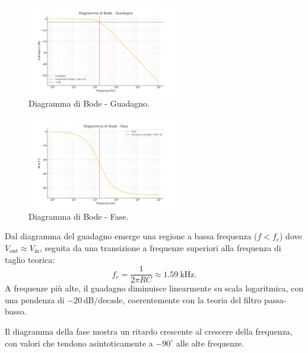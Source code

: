 \documentclass[a4paper,12pt]{article}
\begin{document}
\begin{figure}[H]
\centering
\includegraphics[width=0.6\textwidth]{assets/bode_gain.png}
\caption{Diagramma di Bode - Guadagno.}
\label{fig:bode_gain}
\end{figure}

\begin{figure}[H]
\centering
\includegraphics[width=0.6\textwidth]{assets/bode_phase.png}
\caption{Diagramma di Bode - Fase.}
\label{fig:bode_phase}
\end{figure}

Dal diagramma del guadagno emerge una regione a bassa frequenza (\(f < f_c\)) dove \(V_{\text{out}} \approx V_{\text{in}}\), seguita da una transizione a frequenze superiori alla frequenza di taglio teorica:
\[
f_c = \frac{1}{2 \pi RC} \approx \SI{1.59}{\kilo\hertz}.
\]
A frequenze più alte, il guadagno diminuisce linearmente su scala logaritmica, con una pendenza di \(-20 \, \si{\deci\bel}/\text{decade}\), coerentemente con la teoria del filtro passa-basso.

Il diagramma della fase mostra un ritardo crescente al crescere della frequenza, con valori che tendono asintoticamente a \(-90^\circ\) alle alte frequenze.
\end{document}
